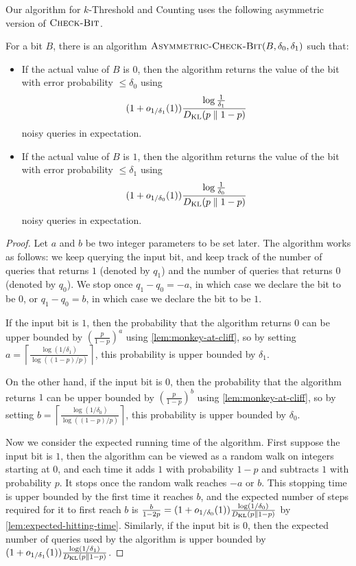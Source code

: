 Our algorithm for $k$-Threshold and Counting uses the following asymmetric version of $\textsc{Check-Bit}$.
\begin{lemma}
\label{lem:asymmetric-check-bit}
    For a bit $B$, there is an algorithm $\textup{\textsc{Asymmetric-Check-Bit}}(B, \delta_0, \delta_1)$ such that:
    \begin{itemize}
        \item If the actual value of $B$ is $0$, then the algorithm returns the value of the bit with error probability $\le \delta_0$
        using
        \[
        (1+o_{1/\delta_1}(1)) \frac{\log \frac{1}{\delta_1}}{D_{\operatorname{\mathrm{KL}}}(p \parallel 1-p)}
        \]
        noisy queries in expectation.
        \item If the actual value of $B$ is $1$, then the algorithm returns the value of the bit with error probability $\le \delta_1$
        using
        \[
        (1+o_{1/\delta_0}(1)) \frac{\log \frac{1}{\delta_0}}{D_{\operatorname{\mathrm{KL}}}(p \parallel 1-p)}
        \]
        noisy queries in expectation.
    \end{itemize}
\end{lemma}
\begin{proof}
Let $a$ and $b$ be two integer parameters to be set later. The algorithm works as follows: we keep querying the input bit, and keep track of the number of queries that returns $1$ (denoted by $q_1$) and the number of queries that returns $0$ (denoted by $q_0$). We stop once $q_1 - q_0 = -a$, in which case we declare the bit to be $0$, or $q_1 - q_0 = b$, in which case we declare the bit to be $1$.

If the input bit is $1$, then the probability that the algorithm returns $0$ can be upper bounded by
$
\left(\frac{p}{1-p}\right)^{a}
$
using \cref{lem:monkey-at-cliff},
so by setting $a = \left\lceil \frac{\log(1/\delta_1)}{\log((1-p) / p)} \right\rceil$, this probability is upper bounded by $\delta_1$.


On the other hand, if the input bit is $0$, then the probability that the algorithm returns $1$ can be upper bounded by
$
\left(\frac{p}{1-p}\right)^{b}
$
using \cref{lem:monkey-at-cliff},
so by setting $b = \left\lceil \frac{\log(1/\delta_0)}{\log((1-p) / p)} \right\rceil $, this probability is upper bounded by $\delta_0$.

Now we consider the expected running time of the algorithm. First suppose the input bit is $1$, then the algorithm can be viewed as a random walk on integers starting at $0$, and each time it adds $1$ with probability $1-p$ and subtracts $1$ with probability $p$. It stops once the random walk reaches $-a$ or $b$. This stopping time is upper bounded by the first time it reaches $b$, and the expected number of steps required for it to first reach $b$ is $\frac{b}{1-2p} = (1+o_{1/\delta_0}(1)) \frac{\log(1/\delta_0)}{D_{\operatorname{\mathrm{KL}}}(p \parallel 1-p)}$ by \cref{lem:expected-hitting-time}. Similarly, if the input bit is $0$, then the expected number of queries used by the algorithm is upper bounded by $(1+o_{1/\delta_1}(1)) \frac{\log(1/\delta_1)}{D_{\operatorname{\mathrm{KL}}}(p \parallel 1-p)}$.
\end{proof}

